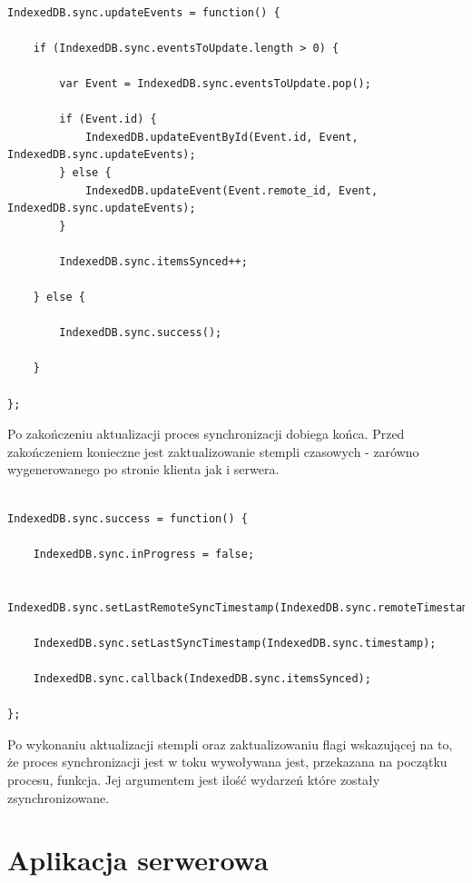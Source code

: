 \begin{lstlisting}[caption=Aktualizacja wydarzeń przechowywanych w lokalnej bazie danych., label=amb, captionpos=b]

IndexedDB.sync.updateEvents = function() {

	if (IndexedDB.sync.eventsToUpdate.length > 0) {

    	var Event = IndexedDB.sync.eventsToUpdate.pop();

    	if (Event.id) {
        	IndexedDB.updateEventById(Event.id, Event, IndexedDB.sync.updateEvents);
    	} else {
        	IndexedDB.updateEvent(Event.remote_id, Event, IndexedDB.sync.updateEvents);
    	}

    	IndexedDB.sync.itemsSynced++;

	} else {

    	IndexedDB.sync.success();

	}

};

\end{lstlisting}

Po zakończeniu aktualizacji proces synchronizacji dobiega końca. Przed zakończeniem konieczne jest zaktualizowanie stempli czasowych - zarówno wygenerowanego po stronie klienta jak i serwera.

\begin{lstlisting}[caption=Kod finalizujący proces synchronizacji., label=amb, captionpos=b]

IndexedDB.sync.success = function() {

	IndexedDB.sync.inProgress = false;

	IndexedDB.sync.setLastRemoteSyncTimestamp(IndexedDB.sync.remoteTimestamp);
    
	IndexedDB.sync.setLastSyncTimestamp(IndexedDB.sync.timestamp);

	IndexedDB.sync.callback(IndexedDB.sync.itemsSynced);

};

\end{lstlisting}

Po wykonaniu aktualizacji stempli oraz zaktualizowaniu flagi wskazującej na to, że proces synchronizacji jest w toku wywoływana jest, przekazana na początku procesu, funkcja. Jej argumentem jest ilość wydarzeń które zostały zsynchronizowane.

\section{Aplikacja serwerowa}
\label{sec:apSerw}

